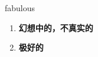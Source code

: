 
\begin{frame}
{\huge fabulous}
\begin{center}
\begin{enumerate}\Large
  \item \textbf{幻想中的，不真实的}
  \item \textbf{极好的}
\end{enumerate}
\end{center}
\end{frame}
